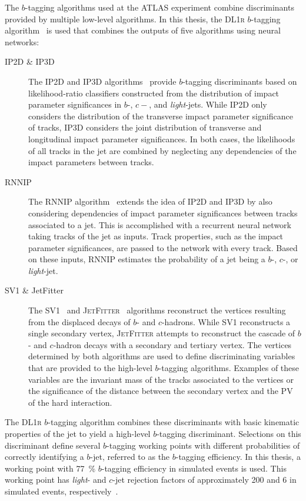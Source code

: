 The $b$-tagging algorithms used at the ATLAS experiment combine discriminants
provided by multiple low-level algorithms. In this thesis, the \textsc{DL1r}
$b$-tagging algorithm~\cite{FTAG-2019-07} is used that combines the outputs
of five algorithms using neural networks:
\begin{description}

\item[IP2D \& IP3D] The \textsc{IP2D} and \textsc{IP3D}
  algorithms~\cite{ATL-PHYS-PUB-2017-013} provide $b$-tagging discriminants
  based on likelihood-ratio classifiers constructed from the distribution of
  impact parameter significances in $b$-, $c-$, and \emph{light}-jets. While
  \textsc{IP2D} only considers the distribution of the transverse impact
  parameter significance of tracks, \textsc{IP3D} considers the joint
  distribution of transverse and longitudinal impact parameter significances.
  In both cases, the likelihoods of all tracks in the jet are combined by
  neglecting any dependencies of the impact parameters between tracks.

\item[RNNIP] The \textsc{RNNIP} algorithm~\cite{ATL-PHYS-PUB-2017-003} extends
  the idea of \textsc{IP2D} and \textsc{IP3D} by also considering dependencies
  of impact parameter significances between tracks associated to a jet. This is
  accomplished with a recurrent neural network taking tracks of the jet as
  inputs. Track properties, such as the impact parameter significances, are
  passed to the network with every track. Based on these inputs, \textsc{RNNIP}
  estimates the probability of a jet being a $b$-, $c$-, or \emph{light}-jet.

\item[SV1 \& JetFitter] The \textsc{SV1}~\cite{ATL-PHYS-PUB-2017-011} and
  \textsc{JetFitter}~\cite{ATL-PHYS-PUB-2018-025} algorithms reconstruct the
  vertices resulting from the displaced decays of $b$- and $c$-hadrons. While
  \textsc{SV1} reconstructs a single secondary vertex, \textsc{JetFitter}
  attempts to reconstruct the cascade of $b$- and $c$-hadron decays with a
  secondary and tertiary vertex. The vertices determined by both algorithms are
  used to define discriminating variables that are provided to the high-level
  $b$-tagging algorithms. Examples of these variables are the invariant mass of
  the tracks associated to the vertices or the significance of the distance
  between the secondary vertex and the PV of the hard interaction.

\end{description}
The \textsc{DL1r} $b$-tagging algorithm combines these discriminants with basic
kinematic properties of the jet to yield a high-level $b$-tagging discriminant.
Selections on this discriminant define several $b$-tagging working points with
different probabilities of correctly identifying a $b$-jet, referred to as the
$b$-tagging efficiency. In this thesis, a working point with \SI{77}{\percent}
$b$-tagging efficiency in simulated \ttbar events is used.  This working point
has \emph{light}- and $c$-jet rejection factors of approximately 200 and 6 in
simulated \ttbar events, respectively~\cite{FTAG-2019-07}.

